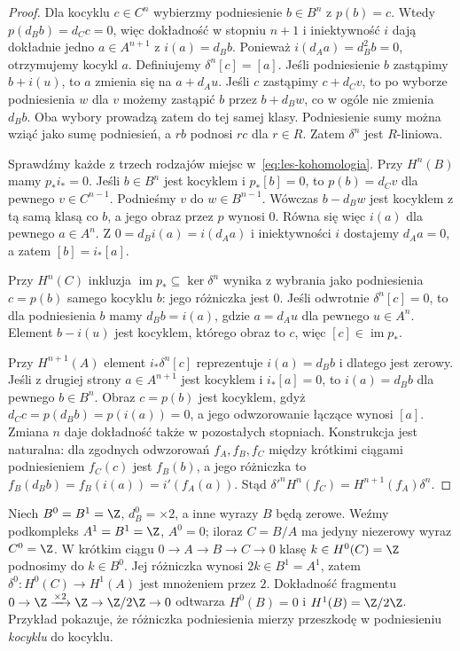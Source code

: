 \begin{proof}
Dla kocyklu $c\in C^n$ wybierzmy podniesienie
$b\in B^n$ z $p(b)=c$.
Wtedy $p(d_Bb)=d_Cc=0$, więc dokładność
w stopniu $n+1$ i iniektywność $i$
dają dokładnie jedno $a\in A^{n+1}$
z $i(a)=d_Bb$.
Ponieważ $i(d_Aa)=d_B^2b=0$,
otrzymujemy kocykl $a$.
Definiujemy $\delta^n[c]=[a]$.
Jeśli podniesienie $b$ zastąpimy $b+i(u)$,
to $a$ zmienia się na $a+d_Au$.
Jeśli $c$ zastąpimy $c+d_Cv$, to po
wyborze podniesienia $w$ dla $v$ możemy
zastąpić $b$ przez $b+d_Bw$,
co w ogóle nie zmienia $d_Bb$.
Oba wybory prowadzą zatem do tej
samej klasy. Podniesienie sumy można wziąć
jako sumę podniesień, a $rb$ podnosi $rc$ dla $r\in R$.
Zatem $\delta^n$ jest $R$-liniowa.

Sprawdźmy każde z trzech rodzajów miejsc
w~\eqref{eq:les-kohomologia}.
Przy $H^n(B)$ mamy $p_*i_*=0$.
Jeśli $b\in B^n$ jest kocyklem
i $p_*[b]=0$, to $p(b)=d_Cv$
dla pewnego $v\in C^{n-1}$.
Podnieśmy $v$ do $w\in B^{n-1}$.
Wówczas $b-d_Bw$ jest kocyklem
z tą samą klasą co $b$, a jego
obraz przez $p$ wynosi $0$.
Równa się więc $i(a)$ dla pewnego
$a\in A^n$. Z $0=d_Bi(a)=i(d_Aa)$
i iniektywności $i$ dostajemy
$d_Aa=0$, a zatem $[b]=i_*[a]$.

Przy $H^n(C)$ inkluzja
$\operatorname{im}p_*\subseteq\ker\delta^n$
wynika z wybrania jako podniesienia $c=p(b)$
samego kocyklu $b$: jego różniczka jest $0$.
Jeśli odwrotnie $\delta^n[c]=0$,
to dla podniesienia $b$ mamy $d_Bb=i(a)$,
gdzie $a=d_Au$ dla pewnego $u\in A^n$.
Element $b-i(u)$ jest kocyklem,
którego obraz to $c$, więc
$[c]\in\operatorname{im}p_*$.

Przy $H^{n+1}(A)$ element
$i_*\delta^n[c]$ reprezentuje
$i(a)=d_Bb$ i dlatego jest zerowy.
Jeśli z drugiej strony $a\in A^{n+1}$
jest kocyklem i $i_*[a]=0$,
to $i(a)=d_Bb$ dla pewnego
$b\in B^n$. Obraz $c=p(b)$ jest
kocyklem, gdyż $d_Cc=p(d_Bb)=p(i(a))=0$,
a jego odwzorowanie łączące wynosi $[a]$.
Zmiana $n$ daje dokładność także
w pozostałych stopniach. Konstrukcja jest naturalna:
dla zgodnych odwzorowań $f_A,f_B,f_C$ między krótkimi ciągami
podniesieniem $f_C(c)$ jest $f_B(b)$, a jego różniczka to
$f_B(d_Bb)=f_B(i(a))=i'(f_A(a))$.
Stąd $\delta'^n H^n(f_C)=H^{n+1}(f_A)\delta^n$.
\end{proof}

\begin{przyklad}
Niech $B^0=B^1=\Z$, $d_B^0=\times2$, a inne
wyrazy $B$ będą zerowe. Weźmy podkompleks
$A^1=B^1=\Z$, $A^0=0$; iloraz $C=B/A$
ma jedyny niezerowy wyraz $C^0=\Z$.
W krótkim ciągu $0\to A\to B\to C\to0$
klasę $k\in H^0(C)=\Z$ podnosimy do $k\in B^0$.
Jej różniczka wynosi $2k\in B^1=A^1$, zatem
$\delta^0:H^0(C)\to H^1(A)$ jest mnożeniem przez $2$.
Dokładność fragmentu
$0\to\Z\xrightarrow{\times2}\Z\to\Z/2\Z\to0$
odtwarza $H^0(B)=0$ i $H^1(B)=\Z/2\Z$.
Przykład pokazuje, że różniczka podniesienia mierzy
przeszkodę w podniesieniu \emph{kocyklu} do kocyklu.
\end{przyklad}

